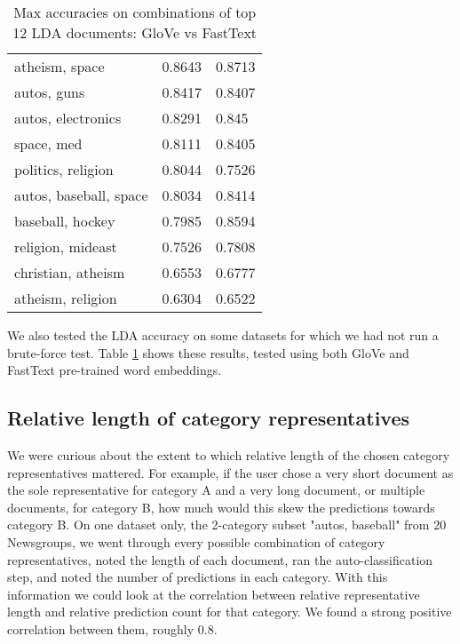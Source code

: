 \begin{table}[]
\begin{tabular}{lll}
atheism, space                              & 0.8643       & 0.8713                 \\
autos, guns                                 & 0.8417       & 0.8407                 \\
autos, electronics                          & 0.8291       & 0.845                  \\
space, med                                  & 0.8111       & 0.8405                 \\
politics, religion                          & 0.8044       & 0.7526                 \\
autos, baseball, space                       & 0.8034       & 0.8414                 \\
baseball, hockey                            & 0.7985       & 0.8594                 \\
religion, mideast                           & 0.7526       & 0.7808                 \\
christian, atheism                          & 0.6553       & 0.6777                 \\
atheism, religion                           & 0.6304       & 0.6522                 \\
\bottomrule
\end{tabular}
\caption{Max accuracies on combinations of top 12 LDA documents: GloVe vs FastText}\label{lda_fasttext}
\end{table}


We also tested the LDA accuracy on some datasets for which we had not run a brute-force test. Table \ref{lda_fasttext} shows these results, tested using both GloVe and FastText pre-trained word embeddings.

\subsection{Relative length of category representatives}
We were curious about the extent to which relative length of the chosen category representatives mattered. For example, if the user chose a very short document as the sole representative for category A and a very long document, or multiple documents, for category B, how much would this skew the predictions towards category B. On one dataset only, the 2-category subset "autos, baseball" from 20 Newsgroups, we went through every possible combination of category representatives, noted the length of each document, ran the auto-classification step, and noted the number of predictions in each category. With this information we could look at the correlation between relative representative length and relative prediction count for that category. We found a strong positive correlation between them, roughly 0.8.
 